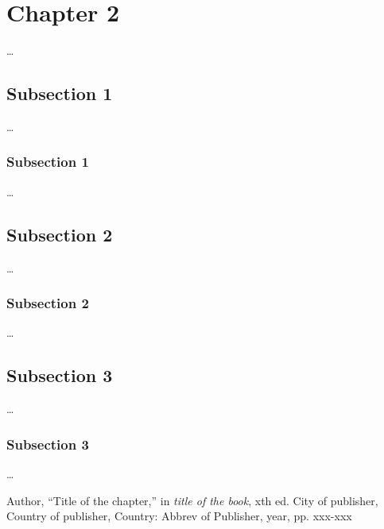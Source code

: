 \documentclass[10pt, a4paper, oneside]{report}
\begin{document}
\chapter{Chapter 2}
\ldots
\section{Subsection 1}
\ldots
\subsection{Subsection 1}
\ldots

\section{Subsection 2}
\ldots
\subsection{Subsection 2}
\ldots

\section{Subsection 3}
\ldots
\subsection{Subsection 3}
\ldots
      
\begin{thebibliography}{9}

  Author,
  ``Title of the chapter,'' in 
  \emph{title of the book},
  xth ed.
  City of publisher,
  Country of publisher,
  Country:
  Abbrev of Publisher,
  year,
  pp. xxx-xxx

\end{thebibliography}      
      
\end{document}
